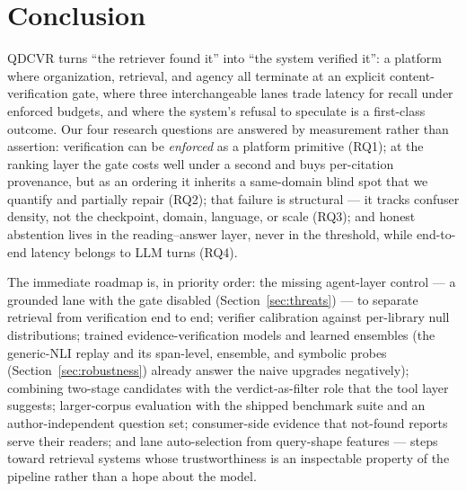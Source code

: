 \section{Conclusion}
\label{sec:conclusion}

QDCVR turns ``the retriever found it'' into ``the system verified it'':
a platform where organization, retrieval, and agency all terminate at an
explicit content-verification gate, where three interchangeable lanes trade
latency for recall under enforced budgets, and where the system's refusal
to speculate is a first-class outcome. Our four research questions are
answered by measurement rather than assertion: verification can be
\emph{enforced} as a platform primitive (RQ1); at the ranking layer the gate
costs well under a second and buys per-citation provenance, but as an ordering
it inherits a same-domain blind spot that we quantify and partially repair
(RQ2); that failure is structural --- it tracks confuser density, not the
checkpoint, domain, language, or scale (RQ3); and honest abstention lives in
the reading--answer layer, never in the threshold, while end-to-end latency
belongs to LLM turns (RQ4).

The immediate roadmap is, in priority order: the missing agent-layer control
--- a grounded lane with the gate disabled (Section~\ref{sec:threats}) --- to
separate retrieval from verification end to end; verifier calibration against
per-library null distributions; trained
evidence-verification models and learned ensembles (the generic-NLI
replay and its span-level, ensemble, and symbolic probes
(Section~\ref{sec:robustness}) already answer the naive upgrades
negatively); combining two-stage
candidates with the verdict-as-filter role that the tool layer suggests;
larger-corpus evaluation with the shipped benchmark suite and an
author-independent question set; consumer-side evidence that
not-found reports serve their readers; and lane auto-selection from
query-shape features --- steps toward retrieval systems whose trustworthiness
is an inspectable property of the pipeline rather than a hope about the
model.

